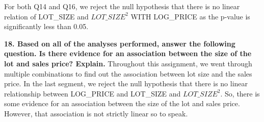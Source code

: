 \documentclass[
]{article}
\begin{document}
For both Q14 and Q16, we reject the null hypothesis that there is no
linear relation of LOT\_SIZE and \(LOT\_SIZE^2\) WITH LOG\_PRICE as the
p-value is significantly less than 0.05.

\textbf{18. Based on all of the analyses performed, answer the following
question. Is there evidence for an association between the size of the
lot and sales price? Explain.} Throughout this assignment, we went
through multiple combinations to find out the association between lot
size and the sales price. In the last segment, we reject the null
hypothesis that there is no linear relationship between LOG\_PRICE and
LOT\_SIZE and \(LOT\_SIZE^2\). So, there is some evidence for an
association between the size of the lot and sales price. However, that
association is not strictly linear so to speak.
\end{document}
